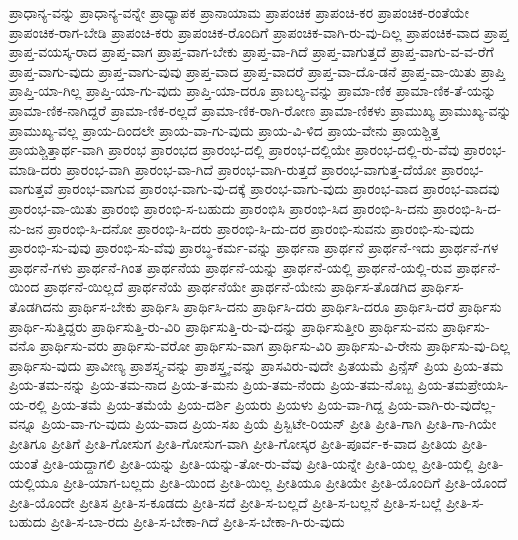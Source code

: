 {ಪ್ರಾಧಾನ್ಯ-ವನ್ನು
ಪ್ರಾಧಾನ್ಯ-ವನ್ನೇ
ಪ್ರಾಧ್ಯಾಪಕ
ಪ್ರಾನಾಯಾಮ
ಪ್ರಾಪಂಚಿಕ
ಪ್ರಾಪಂಚಿ-ಕರ
ಪ್ರಾಪಂಚಿಕ-ರಂತೆಯೇ
ಪ್ರಾಪಂಚಿಕ-ರಾಗ-ಬೇಡಿ
ಪ್ರಾಪಂಚಿ-ಕರು
ಪ್ರಾಪಂಚಿಕ-ರೊಂದಿಗೆ
ಪ್ರಾಪಂಚಿಕ-ವಾಗಿ-ರು-ವು-ದಿಲ್ಲ
ಪ್ರಾಪಂಚಿಕ-ವಾದ
ಪ್ರಾಪ್ತ
ಪ್ರಾಪ್ತ-ವಯಸ್ಕ-ರಾದ
ಪ್ರಾಪ್ತ-ವಾಗ
ಪ್ರಾಪ್ತ-ವಾಗ-ಬೇಕು
ಪ್ರಾಪ್ತ-ವಾ-ಗಿದೆ
ಪ್ರಾಪ್ತ-ವಾಗುತ್ತದೆ
ಪ್ರಾಪ್ತ-ವಾಗು-ವ-ವ-ರೆಗೆ
ಪ್ರಾಪ್ತ-ವಾಗು-ವುದು
ಪ್ರಾಪ್ತ-ವಾಗು-ವುವು
ಪ್ರಾಪ್ತ-ವಾದ
ಪ್ರಾಪ್ತ-ವಾದರೆ
ಪ್ರಾಪ್ತ-ವಾ-ದೊ-ಡನೆ
ಪ್ರಾಪ್ತ-ವಾ-ಯಿತು
ಪ್ರಾಪ್ತಿ
ಪ್ರಾಪ್ತಿ-ಯಾ-ಗಿಲ್ಲ
ಪ್ರಾಪ್ತಿ-ಯಾ-ಗು-ವುದು
ಪ್ರಾಪ್ತಿ-ಯಾ-ದರೂ
ಪ್ರಾಬಲ್ಯ-ವನ್ನು
ಪ್ರಾಮಾ-ಣಿಕ
ಪ್ರಾಮಾ-ಣಿಕ-ತೆ-ಯನ್ನು
ಪ್ರಾಮಾ-ಣಿಕ-ನಾಗಿದ್ದರೆ
ಪ್ರಾಮಾ-ಣಿಕ-ರಲ್ಲದೆ
ಪ್ರಾಮಾ-ಣಿಕ-ರಾಗಿ-ರೋಣ
ಪ್ರಾಮಾ-ಣಿಕಳು
ಪ್ರಾಮುಖ್ಯ
ಪ್ರಾಮುಖ್ಯ-ವನ್ನು
ಪ್ರಾಮುಖ್ಯ-ವಲ್ಲ
ಪ್ರಾಯ-ದಿಂದಲೇ
ಪ್ರಾಯ-ವಾ-ಗು-ವುದು
ಪ್ರಾಯ-ವಿ-ಳಿದ
ಪ್ರಾಯ-ವೇನು
ಪ್ರಾಯಶ್ಚಿತ್ತ
ಪ್ರಾಯಶ್ಚಿತ್ತಾರ್ಥ-ವಾಗಿ
ಪ್ರಾರಂಭ
ಪ್ರಾರಂಭದ
ಪ್ರಾರಂಭ-ದಲ್ಲಿ
ಪ್ರಾರಂಭ-ದಲ್ಲಿಯೇ
ಪ್ರಾರಂಭ-ದಲ್ಲಿ-ರು-ವೆವು
ಪ್ರಾರಂಭ-ಮಾಡಿ-ದರು
ಪ್ರಾರಂಭ-ವಾಗಿ
ಪ್ರಾರಂಭ-ವಾ-ಗಿದೆ
ಪ್ರಾರಂಭ-ವಾಗಿ-ರುತ್ತದೆ
ಪ್ರಾರಂಭ-ವಾಗುತ್ತ-ದೆಯೋ
ಪ್ರಾರಂಭ-ವಾಗುತ್ತವೆ
ಪ್ರಾರಂಭ-ವಾಗುವ
ಪ್ರಾರಂಭ-ವಾಗು-ವು-ದಕ್ಕೆ
ಪ್ರಾರಂಭ-ವಾಗು-ವುದು
ಪ್ರಾರಂಭ-ವಾದ
ಪ್ರಾರಂಭ-ವಾದವು
ಪ್ರಾರಂಭ-ವಾ-ಯಿತು
ಪ್ರಾರಂಭಿ
ಪ್ರಾರಂಭಿ-ಸ-ಬಹುದು
ಪ್ರಾರಂಭಿಸಿ
ಪ್ರಾರಂಭಿ-ಸಿದ
ಪ್ರಾರಂಭಿ-ಸಿ-ದನು
ಪ್ರಾರಂಭಿ-ಸಿ-ದ-ನು-ಜನ
ಪ್ರಾರಂಭಿ-ಸಿ-ದನೋ
ಪ್ರಾರಂಭಿ-ಸಿ-ದರು
ಪ್ರಾರಂಭಿ-ಸಿ-ದು-ದರ
ಪ್ರಾರಂಭಿ-ಸುವನು
ಪ್ರಾರಂಭಿ-ಸು-ವುದು
ಪ್ರಾರಂಭಿ-ಸು-ವುವು
ಪ್ರಾರಂಭಿ-ಸು-ವೆವು
ಪ್ರಾರಬ್ಧ-ಕರ್ಮ-ವನ್ನು
ಪ್ರಾರ್ಥನಾ
ಪ್ರಾರ್ಥನೆ
ಪ್ರಾರ್ಥನೆ-ಇದು
ಪ್ರಾರ್ಥನೆ-ಗಳ
ಪ್ರಾರ್ಥನೆ-ಗಳು
ಪ್ರಾರ್ಥನೆ-ಗಿಂತ
ಪ್ರಾರ್ಥನೆಯ
ಪ್ರಾರ್ಥನೆ-ಯನ್ನು
ಪ್ರಾರ್ಥನೆ-ಯಲ್ಲಿ
ಪ್ರಾರ್ಥನೆ-ಯಲ್ಲಿ-ರುವ
ಪ್ರಾರ್ಥನೆ-ಯಿಂದ
ಪ್ರಾರ್ಥನೆ-ಯಿಲ್ಲದೆ
ಪ್ರಾರ್ಥನೆಯೆ
ಪ್ರಾರ್ಥನೆಯೇ
ಪ್ರಾರ್ಥನೆ-ಯೇನು
ಪ್ರಾರ್ಥಿಸ-ತೊಡಗಿದ
ಪ್ರಾರ್ಥಿಸ-ತೊಡಗಿದನು
ಪ್ರಾರ್ಥಿಸ-ಬೇಕು
ಪ್ರಾರ್ಥಿಸಿ
ಪ್ರಾರ್ಥಿಸಿ-ದನು
ಪ್ರಾರ್ಥಿಸಿ-ದರು
ಪ್ರಾರ್ಥಿಸಿ-ದರೂ
ಪ್ರಾರ್ಥಿಸಿ-ದರೆ
ಪ್ರಾರ್ಥಿಸು
ಪ್ರಾರ್ಥಿ-ಸುತ್ತಿದ್ದರು
ಪ್ರಾರ್ಥಿಸುತ್ತಿ-ರು-ವಿರಿ
ಪ್ರಾರ್ಥಿಸುತ್ತಿ-ರು-ವು-ದನ್ನು
ಪ್ರಾರ್ಥಿಸುತ್ತೀರಿ
ಪ್ರಾರ್ಥಿಸು-ವನು
ಪ್ರಾರ್ಥಿಸು-ವನೊ
ಪ್ರಾರ್ಥಿಸು-ವರು
ಪ್ರಾರ್ಥಿಸು-ವರೋ
ಪ್ರಾರ್ಥಿಸು-ವಾಗ
ಪ್ರಾರ್ಥಿಸು-ವಿರಿ
ಪ್ರಾರ್ಥಿಸು-ವಿ-ರೇನು
ಪ್ರಾರ್ಥಿಸು-ವು-ದಿಲ್ಲ
ಪ್ರಾರ್ಥಿಸು-ವುದು
ಪ್ರಾವೀಣ್ಯ
ಪ್ರಾಶಸ್ತ್ಯ-ವನ್ನು
ಪ್ರಾಶಸ್ತ್ರ್ಯ-ವನ್ನು
ಪ್ರಾಸವಿರು-ವುದೇ
ಪ್ರಿತಯಮೆ
ಪ್ರಿನ್ಸೆಸ್
ಪ್ರಿಯ
ಪ್ರಿಯ-ತಮ
ಪ್ರಿಯ-ತಮ-ನನ್ನು
ಪ್ರಿಯ-ತಮ-ನಾದ
ಪ್ರಿಯ-ತ-ಮನು
ಪ್ರಿಯ-ತಮ-ನೆಂದು
ಪ್ರಿಯ-ತಮ-ನೊಬ್ಬ
ಪ್ರಿಯ-ತಮಪ್ರೇಯಸಿ-ಯ-ರಲ್ಲಿ
ಪ್ರಿಯ-ತಮೆ
ಪ್ರಿಯ-ತಮೆಯೆ
ಪ್ರಿಯ-ದರ್ಶಿ
ಪ್ರಿಯರು
ಪ್ರಿಯಳು
ಪ್ರಿಯ-ವಾ-ಗಿದ್ದ
ಪ್ರಿಯ-ವಾಗಿ-ರು-ವುದೆಲ್ಲ-ವನ್ನೂ
ಪ್ರಿಯ-ವಾ-ಗು-ವುದು
ಪ್ರಿಯ-ವಾದ
ಪ್ರಿಯ-ಸಖ
ಪ್ರಿಯೆ
ಪ್ರಿಸ್ಬಿಟೇ-ರಿಯನ್
ಪ್ರೀತಿ
ಪ್ರೀತಿ-ಗಾಗಿ
ಪ್ರೀತಿ-ಗಾ-ಗಿಯೇ
ಪ್ರೀತಿಗೂ
ಪ್ರೀತಿಗೆ
ಪ್ರೀತಿ-ಗೋಸುಗ
ಪ್ರೀತಿ-ಗೋಸುಗ-ವಾಗಿ
ಪ್ರೀತಿ-ಗೋಸ್ಕರ
ಪ್ರೀತಿ-ಪೂರ್ವ-ಕ-ವಾದ
ಪ್ರೀತಿಯ
ಪ್ರೀತಿ-ಯಂತೆ
ಪ್ರೀತಿ-ಯದ್ದಾಗಲಿ
ಪ್ರೀತಿ-ಯನ್ನು
ಪ್ರೀತಿ-ಯನ್ನು-ತೋ-ರು-ವೆವು
ಪ್ರೀತಿ-ಯನ್ನೇ
ಪ್ರೀತಿ-ಯಲ್ಲ
ಪ್ರೀತಿ-ಯಲ್ಲಿ
ಪ್ರೀತಿ-ಯಲ್ಲಿಯೂ
ಪ್ರೀತಿ-ಯಾಗ-ಬಲ್ಲದು
ಪ್ರೀತಿ-ಯಿಂದ
ಪ್ರೀತಿ-ಯಿಲ್ಲ
ಪ್ರೀತಿಯೂ
ಪ್ರೀತಿಯೇ
ಪ್ರೀತಿ-ಯೊಂದಿಗೆ
ಪ್ರೀತಿ-ಯೊಂದೆ
ಪ್ರೀತಿ-ಯೊಂದೇ
ಪ್ರೀತಿಸ
ಪ್ರೀತಿ-ಸ-ಕೂಡದು
ಪ್ರೀತಿ-ಸದೆ
ಪ್ರೀತಿ-ಸ-ಬಲ್ಲದೆ
ಪ್ರೀತಿ-ಸ-ಬಲ್ಲನೆ
ಪ್ರೀತಿ-ಸ-ಬಲ್ಲೆ
ಪ್ರೀತಿ-ಸ-ಬಹುದು
ಪ್ರೀತಿ-ಸ-ಬಾ-ರದು
ಪ್ರೀತಿ-ಸ-ಬೇಕಾ-ಗಿದೆ
ಪ್ರೀತಿ-ಸ-ಬೇಕಾ-ಗಿ-ರು-ವುದು
}
